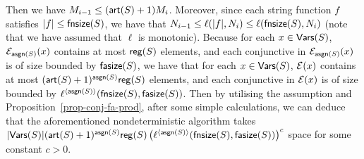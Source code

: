 {%
%
%
%
Then we have $M_{i-1} \le (\mathsf{art}(S)+1)M_i $. Moreover, since each string function $f$ satisfies   $|f| \le \mathsf{fnsize}(S)$, we have that $N_{i-1} \le \ell(|f|, N_i) \le \ell(\mathsf{fnsize}(S), N_i)$ (note that we have assumed that $\ell$ is monotonic). Because for each $x \in \mathsf{Vars}(S)$, $\mathcal{E}_{\mathsf{asgn}(S)}(x)$ contains at most $\mathsf{reg}(S)$ elements, and 
each conjunctive \FA{} in $\mathcal{E}_{\mathsf{asgn}(S)}(x)$ is of size bounded by $\mathsf{fasize}(S)$, we have that for each $x \in \mathsf{Vars}(S)$, $\mathcal{E}(x)$ contains at most $(\mathsf{art}(S)+1)^{\mathsf{asgn}(S)}\mathsf{reg}(S)$ elements, and each conjunctive \FA{} in $\mathcal{E}(x)$ is of size bounded by $\ell^{\langle \mathsf{asgn}(S) \rangle}(\mathsf{fnsize}(S), \mathsf{fasize}(S))$. 
Then by utilising  the \prerec{} assumption and Proposition~\ref{prop-conj-fa-prod}, after some simple calculations, we can deduce that the aforementioned nondeterministic algorithm takes 
$|\mathsf{Vars}(S)|(\mathsf{art}(S)+1)^{\mathsf{asgn}(S)}  \mathsf{reg}(S) \left(\ell^{\langle \mathsf{asgn}(S) \rangle}(\mathsf{fnsize}(S), \mathsf{fasize}(S)) \right)^c$
 space for some constant $c > 0$.
 


}
